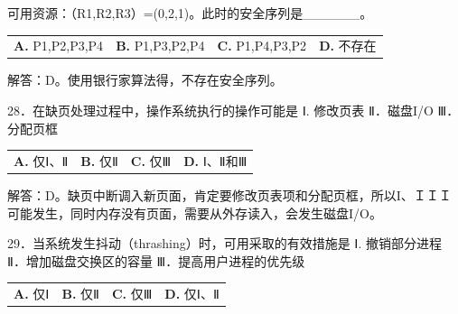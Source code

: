 \documentclass[UTF8,11pt]{ctexart}
\begin{document}
可用资源：（R1,R2,R3）=(0,2,1)。此时的安全序列是\_\_\_\_\_\_。


\begin{center}\begin{tabular}{>{\raggedright\arraybackslash}p{\dimexpr(\linewidth-8\tabcolsep)/4\relax}>{\raggedright\arraybackslash}p{\dimexpr(\linewidth-8\tabcolsep)/4\relax}>{\raggedright\arraybackslash}p{\dimexpr(\linewidth-8\tabcolsep)/4\relax}>{\raggedright\arraybackslash}p{\dimexpr(\linewidth-8\tabcolsep)/4\relax}}
\textbf{A.} P1,P2,P3,P4 & \textbf{B.} P1,P3,P2,P4 & \textbf{C.} P1,P4,P3,P2 & \textbf{D.} 不存在\\[.35em]\end{tabular}\end{center}

解答：D。使用银行家算法得，不存在安全序列。


28．在缺页处理过程中，操作系统执行的操作可能是 Ⅰ. 修改页表 Ⅱ．磁盘I/O Ⅲ．分配页框


\begin{center}\begin{tabular}{>{\raggedright\arraybackslash}p{\dimexpr(\linewidth-8\tabcolsep)/4\relax}>{\raggedright\arraybackslash}p{\dimexpr(\linewidth-8\tabcolsep)/4\relax}>{\raggedright\arraybackslash}p{\dimexpr(\linewidth-8\tabcolsep)/4\relax}>{\raggedright\arraybackslash}p{\dimexpr(\linewidth-8\tabcolsep)/4\relax}}
\textbf{A.} 仅Ⅰ、Ⅱ & \textbf{B.} 仅Ⅱ & \textbf{C.} 仅Ⅲ & \textbf{D.} Ⅰ、Ⅱ和Ⅲ\\[.35em]\end{tabular}\end{center}

解答：D。缺页中断调入新页面，肯定要修改页表项和分配页框，所以I、ＩＩＩ可能发生，同时内存没有页面，需要从外存读入，会发生磁盘I/O。


29．当系统发生抖动（thrashing）时，可用采取的有效措施是 Ⅰ. 撤销部分进程 Ⅱ．增加磁盘交换区的容量 Ⅲ．提高用户进程的优先级


\begin{center}\begin{tabular}{>{\raggedright\arraybackslash}p{\dimexpr(\linewidth-8\tabcolsep)/4\relax}>{\raggedright\arraybackslash}p{\dimexpr(\linewidth-8\tabcolsep)/4\relax}>{\raggedright\arraybackslash}p{\dimexpr(\linewidth-8\tabcolsep)/4\relax}>{\raggedright\arraybackslash}p{\dimexpr(\linewidth-8\tabcolsep)/4\relax}}
\textbf{A.} 仅Ⅰ & \textbf{B.} 仅Ⅱ & \textbf{C.} 仅Ⅲ & \textbf{D.} 仅Ⅰ、Ⅱ\\[.35em]\end{tabular}\end{center}
\end{document}
